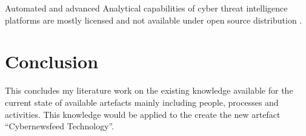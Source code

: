 Automated and advanced Analytical capabilities of cyber threat intelligence platforms are mostly licensed and not available under open source distribution \citep{sauerwein2017threat}.

\section{Conclusion}
This concludes my literature work on the existing knowledge available for the current state of available artefacts mainly including people, processes and activities. This knowledge would be applied to the create the new artefact \enquote{Cybernewsfeed Technology}.


